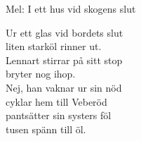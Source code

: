 \begin{SongText}[Hästhandlar’n]
    \begin{SongInfo}
        Mel: I ett hus vid skogens slut
    \end{SongInfo}
    \begin{SongVerse}
        Ur ett glas vid bordets slut\\%
        liten starköl rinner ut.\\%
        Lennart stirrar på sitt stop\\%
        bryter nog ihop.\\%
        Nej, han vaknar ur sin nöd\\%
        cyklar hem till Veberöd\\%
        pantsätter sin systers föl\\%
        tusen spänn till öl.
    \end{SongVerse}
\end{SongText}